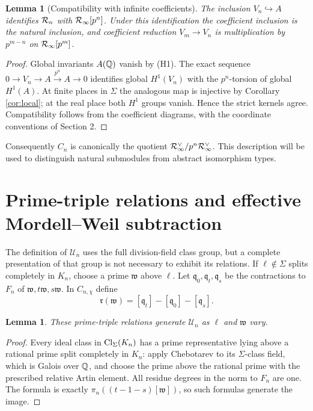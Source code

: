 \documentclass[11pt,a4paper]{article}
\newtheorem{lemma}[theorem]{Lemma}
\theoremstyle{definition}\newtheorem{definition}[theorem]{Definition}
\theoremstyle{remark}\newtheorem{remark}[theorem]{Remark}
\numberwithin{equation}{section}
\begin{document}
\begin{lemma}[Compatibility with infinite coefficients]\label{lem:infty}
The inclusion $V_n\hookrightarrow A$ identifies $\mathcal R_n$ with $\mathcal R_\infty[p^n]$. Under this identification the coefficient inclusion is the natural inclusion, and coefficient reduction $V_m\to V_n$ is multiplication by $p^{m-n}$ on $\mathcal R_\infty[p^m]$.
\end{lemma}
\begin{proof}
Global invariants $A(\mathbb Q)$ vanish by (H1). The exact sequence $0\to V_n\to A\xrightarrow{p^n}A\to0$ identifies global $H^1(V_n)$ with the $p^n$-torsion of global $H^1(A)$. At finite places in $\Sigma$ the analogous map is injective by Corollary \ref{cor:local}; at the real place both $H^1$ groups vanish. Hence the strict kernels agree. Compatibility follows from the coefficient diagrams, with the coordinate conventions of Section 2.\end{proof}
Consequently $C_n$ is canonically the quotient $\mathcal R_\infty^\vee/p^n\mathcal R_\infty^\vee$. This description will be used to distinguish natural submodules from abstract isomorphism types.


\section{Prime-triple relations and effective Mordell--Weil subtraction}
The definition of $\mathscr U_n$ uses the full division-field class group, but a complete presentation of that group is not necessary to exhibit its relations. If $\ell\notin\Sigma$ splits completely in $K_n$, choose a prime $\mathfrak w$ above $\ell$. Let $\mathfrak q_0,\mathfrak q_t,\mathfrak q_s$ be the contractions to $F_n$ of $\mathfrak w,t\mathfrak w,s\mathfrak w$. In $C_{n,\chi}$ define
\begin{equation}
\mathfrak r(\mathfrak w)=[\mathfrak q_t]-[\mathfrak q_0]-[\mathfrak q_s].
\end{equation}
\begin{lemma}\label{lem:prime}
These prime-triple relations generate $\mathscr U_n$ as $\ell$ and $\mathfrak w$ vary.
\end{lemma}
\begin{proof}
Every ideal class in $\operatorname{Cl}_\Sigma(K_n)$ has a prime representative lying above a rational prime split completely in $K_n$: apply Chebotarev to its $\Sigma$-class field, which is Galois over $\mathbb Q$, and choose the prime above the rational prime with the prescribed relative Artin element. All residue degrees in the norm to $F_n$ are one. The formula is exactly $\pi_n((t-1-s)[\mathfrak w])$, so such formulas generate the image.\end{proof}
\end{document}
